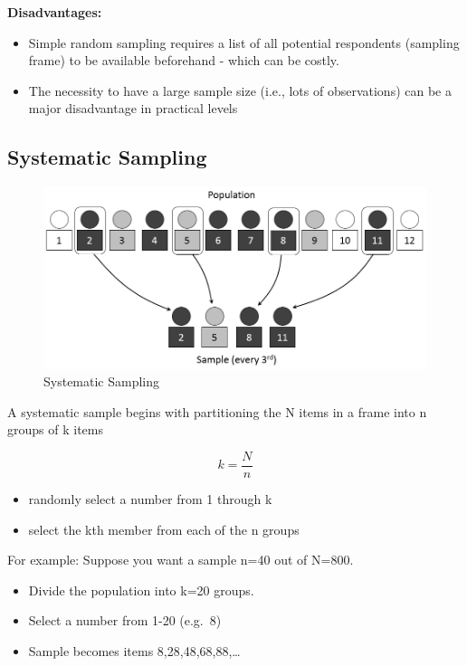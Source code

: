 \documentclass[
]{book}
\begin{document}
\textbf{Disadvantages:}

\begin{itemize}
\item
  Simple random sampling requires a list of all potential respondents (sampling frame) to be available beforehand - which can be costly.
\item
  The necessity to have a large sample size (i.e., lots of observations) can be a major disadvantage in practical levels
\end{itemize}

\hypertarget{systematic-sampling}{%
\subsection{Systematic Sampling}\label{systematic-sampling}}

\begin{figure}

{\centering \includegraphics[width=0.7\linewidth]{images/Systematic} 

}

\caption{Systematic Sampling}\label{fig:unnamed-chunk-23}
\end{figure}

A systematic sample begins with partitioning the N items in a frame into n groups of k items

\[k=\frac{N}{n}\]

\begin{itemize}
\item
  randomly select a number from 1 through k
\item
  select the kth member from each of the n groups
\end{itemize}

For example: Suppose you want a sample n=40 out of N=800.

\begin{itemize}
\item
  Divide the population into k=20 groups.
\item
  Select a number from 1-20 (e.g.~8)
\item
  Sample becomes items 8,28,48,68,88,\ldots{}
\end{itemize}
\end{document}
